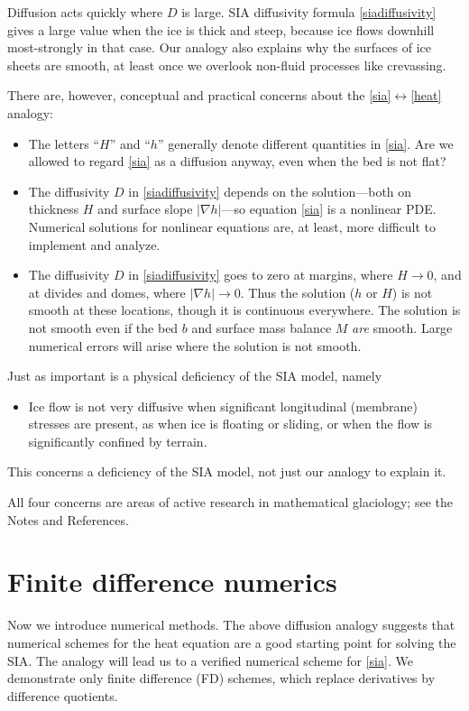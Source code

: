 \documentclass[letterpaper,final,12pt,reqno]{amsart}
\newcommand{\grad}{\nabla}
\begin{document}
Diffusion acts quickly where $D$ is large.  SIA diffusivity formula \eqref{siadiffusivity} gives a large value when the ice is thick and steep, because ice flows downhill most-strongly in that case.  Our analogy also explains why the surfaces of ice sheets are smooth, at least once we overlook non-fluid processes like crevassing.

There are, however, conceptual and practical concerns about the \eqref{sia}$\leftrightarrow$\eqref{heat} analogy:
\begin{itemize}
\item The letters ``$H$'' and ``$h$'' generally denote different quantities in \eqref{sia}.  Are we allowed to regard \eqref{sia} as a diffusion anyway, even when the bed is not flat?
\item The diffusivity $D$ in \eqref{siadiffusivity} depends on the solution---both on thickness $H$ and surface slope $|\grad h|$---so equation \eqref{sia} is a nonlinear PDE.  Numerical solutions for nonlinear equations are, at least, more difficult to implement and analyze.
\item The diffusivity $D$ in \eqref{siadiffusivity} goes to zero at margins, where $H\to 0$, and at divides and domes, where $|\grad h|\to 0$.  Thus the solution ($h$ or $H$) is not smooth at these locations, though it is continuous everywhere.  The solution is not smooth even if the bed $b$ and surface mass balance $M$ \emph{are} smooth.  Large numerical errors will arise where the solution is not smooth.
\end{itemize}

Just as important is a physical deficiency of the SIA model, namely
\begin{itemize}
\item Ice flow is not very diffusive when significant longitudinal (membrane) stresses are present, as when ice is floating or sliding, or when the flow is significantly confined by terrain.
\end{itemize}
This concerns a deficiency of the SIA model, not just our analogy to explain it.

All four concerns are areas of active research in mathematical glaciology; see the Notes and References.


\section{Finite difference numerics}  \label{sec:fd}

Now we introduce numerical methods.  The above diffusion analogy suggests that numerical schemes for the heat equation are a good starting point for solving the SIA.  The analogy will lead us to a verified numerical scheme for \eqref{sia}.  We demonstrate only finite difference (FD) schemes, which replace derivatives by difference quotients.
\end{document}
